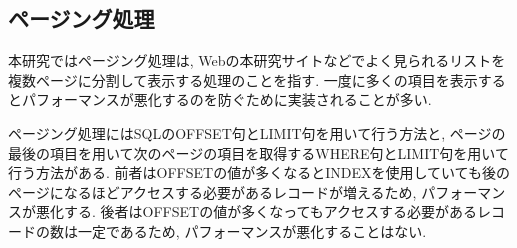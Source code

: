 \documentclass[../../../main]{subfiles}
\begin{document}
    \subsection{ページング処理}\label{subsec:phraseology-paging_pagination}

    本研究ではページング処理は, Webの本研究サイトなどでよく見られるリストを複数ページに分割して表示する処理のことを指す. 一度に多くの項目を表示するとパフォーマンスが悪化するのを防ぐために実装されることが多い.

    ページング処理にはSQLのOFFSET句とLIMIT句を用いて行う方法と, ページの最後の項目を用いて次のページの項目を取得するWHERE句とLIMIT句を用いて行う方法がある. 前者はOFFSETの値が多くなるとINDEXを使用していても後のページになるほどアクセスする必要があるレコードが増えるため, パフォーマンスが悪化する. 後者はOFFSETの値が多くなってもアクセスする必要があるレコードの数は一定であるため, パフォーマンスが悪化することはない.
\end{document}
